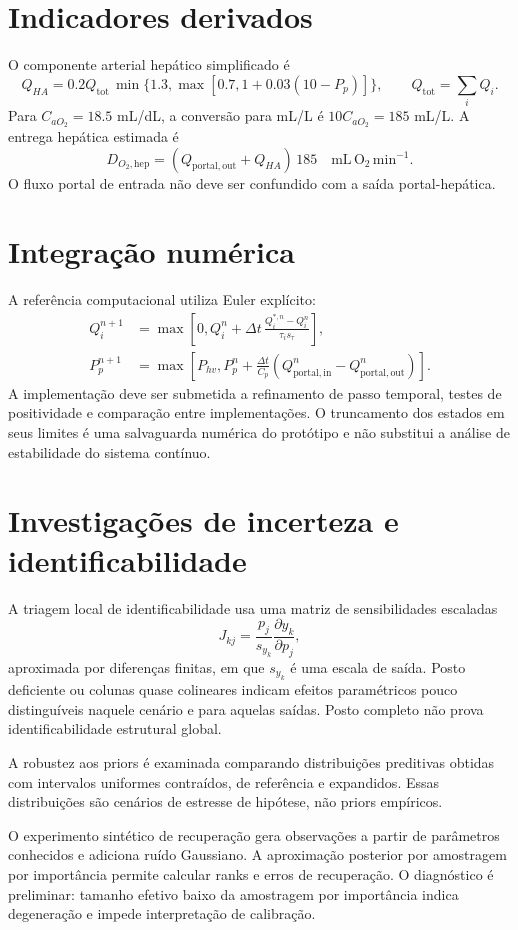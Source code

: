 \documentclass[11pt,a4paper]{article}
\begin{document}
\section{Indicadores derivados}
O componente arterial hepático simplificado é
\[
Q_{HA}=0.2Q_{\mathrm{tot}}\,
\min\{1.3,\max[0.7,1+0.03(10-P_p)]\},
\qquad Q_{\mathrm{tot}}=\sum_iQ_i.
\]
Para $C_{aO_2}=18.5$ mL/dL, a conversão para mL/L é $10C_{aO_2}=185$ mL/L. A entrega hepática estimada é
\[
D_{O_2,\mathrm{hep}}=(Q_{\mathrm{portal,out}}+Q_{HA})\,185
\quad\mathrm{mL\,O_2\,min^{-1}}.
\]
O fluxo portal de entrada não deve ser confundido com a saída portal-hepática.

\section{Integração numérica}
A referência computacional utiliza Euler explícito:
\begin{align}
Q_i^{n+1}&= \max\left[0,Q_i^n+\Delta t\,
\frac{Q_i^{*,n}-Q_i^n}{\tau_i s_\tau}\right],\\
P_p^{n+1}&=\max\left[P_{hv},P_p^n+\frac{\Delta t}{C_p}
(Q_{\mathrm{portal,in}}^n-Q_{\mathrm{portal,out}}^n)\right].
\end{align}
A implementação deve ser submetida a refinamento de passo temporal, testes de positividade e comparação entre implementações. O truncamento dos estados em seus limites é uma salvaguarda numérica do protótipo e não substitui a análise de estabilidade do sistema contínuo.

\section{Investigações de incerteza e identificabilidade}
A triagem local de identificabilidade usa uma matriz de sensibilidades escaladas
\[
J_{kj}=\frac{p_j}{s_{y_k}}\frac{\partial y_k}{\partial p_j},
\]
aproximada por diferenças finitas, em que $s_{y_k}$ é uma escala de saída. Posto deficiente ou colunas quase colineares indicam efeitos paramétricos pouco distinguíveis naquele cenário e para aquelas saídas. Posto completo não prova identificabilidade estrutural global.

A robustez aos priors é examinada comparando distribuições preditivas obtidas com intervalos uniformes contraídos, de referência e expandidos. Essas distribuições são cenários de estresse de hipótese, não priors empíricos.

O experimento sintético de recuperação gera observações a partir de parâmetros conhecidos e adiciona ruído Gaussiano. A aproximação posterior por amostragem por importância permite calcular ranks e erros de recuperação. O diagnóstico é preliminar: tamanho efetivo baixo da amostragem por importância indica degeneração e impede interpretação de calibração.
\end{document}
